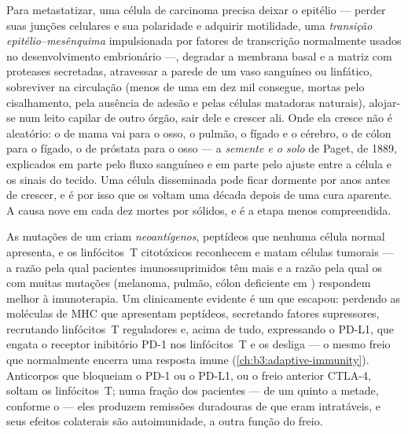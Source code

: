 \begin{definition}\label{def:b3:cancer-biology:metastasis}
Para metastatizar, uma célula de carcinoma precisa deixar o epitélio
--- perder suas junções celulares e sua polaridade e adquirir
motilidade, uma \emph{transição epitélio--mesênquima} impulsionada por
fatores de transcrição normalmente usados no desenvolvimento
embrionário ---, degradar a membrana basal e a matriz com proteases
secretadas, atravessar a parede de um vaso sanguíneo ou linfático,
sobreviver na circulação (menos de uma em dez mil consegue, mortas pelo
cisalhamento, pela ausência de adesão e pelas células matadoras
naturais), alojar-se num leito capilar de outro órgão, sair dele e
crescer ali. Onde ela cresce não é aleatório: o  de mama vai para
o osso, o pulmão, o fígado e o cérebro, o de cólon para o fígado, o de
próstata para o osso --- a \emph{semente e o solo} de Paget, de 1889,
explicados em parte pelo fluxo sanguíneo e em parte pelo ajuste entre a
célula e os sinais do tecido. Uma célula disseminada pode ficar
dormente por anos antes de crescer, e é por isso que os 
voltam uma década depois de uma cura aparente. A  causa nove
em cada dez mortes por  sólidos, e é a etapa menos compreendida.
\end{definition}

\begin{proposition}\label{prop:b3:cancer-biology:immune}
As mutações de um  criam \emph{neoantígenos}, peptídeos que
nenhuma célula normal apresenta, e os linfócitos~T citotóxicos
reconhecem e matam células tumorais --- a razão pela qual pacientes
imunossuprimidos têm mais  e a razão pela qual os  com
muitas mutações (melanoma, pulmão, cólon deficiente em ) respondem melhor à imunoterapia. Um  clinicamente
evidente é um que escapou: perdendo as moléculas de MHC que apresentam
peptídeos, secretando fatores supressores, recrutando linfócitos~T
reguladores e, acima de tudo, expressando o PD-L1, que engata o
receptor inibitório PD-1 nos linfócitos~T e os desliga --- o mesmo
freio que normalmente encerra uma resposta imune
(\cref{ch:b3:adaptive-immunity}). Anticorpos que bloqueiam o PD-1 ou o
PD-L1, ou o freio anterior CTLA-4, soltam os linfócitos~T; numa fração
dos pacientes --- de um quinto a metade, conforme o  --- eles
produzem remissões duradouras de  que eram intratáveis, e seus
efeitos colaterais são autoimunidade, a outra função do freio.
\end{proposition}

